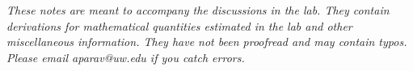 \documentclass[11pt]{article}
\begin{document}
\begin{center}
  \setlength\fboxsep{0.5cm}
\end{center}

\textit{These notes are meant to accompany the discussions in the lab. They contain derivations for mathematical quantities estimated in the lab and other miscellaneous information. They have not been proofread and may contain typos. Please email aparav@uw.edu if you catch errors.}
\end{document}
